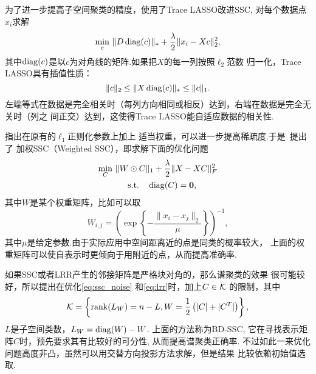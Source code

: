为了进一步提高子空间聚类的精度，\cite{lu2013correlation}使用了Trace
LASSO改进SSC, 对每个数据点\(x_i\)求解
\begin{equation}
  \min_{c}\, \|D\operatorname{diag}(c)\|_* + \frac{\lambda}{2}\|x_i - Xc\|_2^2,
  \label{eq:cass}
\end{equation}
其中\(\operatorname{diag}(c)\)是以\(c\)为对角线的矩阵.如果把\(X\)的每一列按照\(\ell_2\)范数
归一化，Trace LASSO具有插值性质：
\[
  \|c\|_2\le \|X\operatorname{diag}(c)\|_*\le \|c\|_1.
\]
左端等式在数据是完全相关时（每列方向相同或相反）达到，右端在数据是完全无关时（列之
间正交）达到，这使得Trace LASSO能自适应数据的相关性.

\cite{candes2008enhancing}指出在原有的\(\ell_1\)正则化参数上加上
适当权重，可以进一步提高稀疏度.于是~\cite{pham2012improved}提出了
加权SSC（Weighted SSC），即求解下面的优化问题
\begin{equation}
  \begin{gathered}
    \min_{C}\, \|W\odot C\|_1 + \frac{\lambda}{2}\|X-XC\|_F^2 \\
    \quad \text{s.t.}\quad \operatorname{diag}(C) = \mathbf{0},
  \end{gathered}
  \label{eq:wssc}
\end{equation}
其中\(W\)是某个权重矩阵，比如可以取
\[
  W_{i,j} = \left( \exp\left\{ -\frac{\|x_i-x_j\|_2}{\mu}
\right\} \right)^{-1},
\]
其中\(\mu\)是给定参数.由于实际应用中空间距离近的点是同类的概率较大，
上面的权重矩阵可以使自表示时更倾向于用附近的点，从而提高准确率.

如果SSC或者LRR产生的邻接矩阵是严格块对角的，那么谱聚类的效果
很可能较好，所以\cite{feng2014robust}提出在优化\eqref{eq:ssc_noise}
和\eqref{eq:lrr}时，加上\(C \in \mathcal{K}\) 的限制，其中
\[\mathcal{K} = \left\{ \operatorname{rank}(L_W)=n-L, W=\frac{1}{2}\left( |C|+|C^T| \right) \right\},\]
\(L\)是子空间类数，\(L_W=\operatorname{diag}(W)-W\). 上面的方法称为BD-SSC,
它在寻找表示矩阵\(C\)时，预先要求其有比较好的可分性, 从而提高谱聚类正确率. 
不过如此一来优化问题高度非凸，虽然可以用交替方向投影方法求解，但是结果
比较依赖初始值选取.

